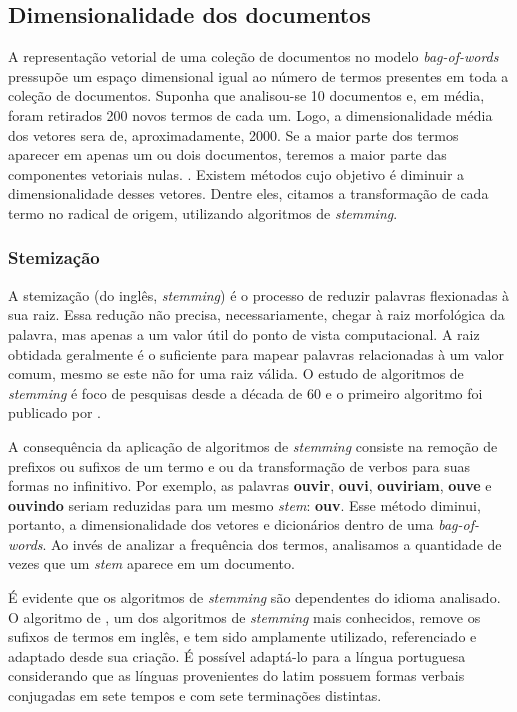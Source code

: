 \subsection{Dimensionalidade dos documentos}
\label{sub:dimensionalidade_dos_documentos}

A representação vetorial de uma coleção de documentos no modelo \textit{bag-of-words} pressupõe um espaço dimensional igual ao número de termos presentes em toda a coleção de documentos. Suponha que analisou-se 10 documentos e, em média, foram retirados 200 novos termos de cada um. Logo, a dimensionalidade média dos vetores sera de, aproximadamente, 2000. Se a maior parte dos termos aparecer em apenas um ou dois documentos, teremos a maior parte das componentes vetoriais nulas. \cite{pretext}. Existem métodos cujo objetivo é diminuir a dimensionalidade desses vetores. Dentre eles, citamos a transformação de cada termo no radical de origem, utilizando algoritmos de \textit{stemming}.

\subsubsection{Stemização}
\label{ssub:stemização}

A stemização (do inglês, \textit{stemming}) é o processo de reduzir palavras flexionadas à sua raiz. Essa redução não precisa, necessariamente, chegar à raiz morfológica da palavra, mas apenas a um valor útil do ponto de vista computacional. A raiz obtidada geralmente é o suficiente para mapear palavras relacionadas à um valor comum, mesmo se este não for uma raiz válida. O estudo de algoritmos de \textit{stemming} é foco de pesquisas desde a década de 60 e o primeiro algoritmo foi publicado por .

A consequência da aplicação de algoritmos de \textit{stemming} consiste na remoção de prefixos ou sufixos de um termo e ou da transformação de verbos para suas formas no infinitivo. Por exemplo, as palavras \textbf{ouvir}, \textbf{ouvi}, \textbf{ouviriam}, \textbf{ouve} e \textbf{ouvindo} seriam reduzidas para um mesmo \textit{stem}: \textbf{ouv}. Esse método diminui, portanto, a dimensionalidade dos vetores e dicionários dentro de uma \textit{bag-of-words}. Ao invés de analizar a frequência dos termos, analisamos a quantidade de vezes que um \textit{stem} aparece em um documento.

É evidente que os algoritmos de \textit{stemming} são dependentes do idioma analisado. O algoritmo de , um dos algoritmos de \textit{stemming} mais conhecidos, remove os sufixos de termos em inglês, e tem sido amplamente utilizado, referenciado e adaptado desde sua criação. É possível adaptá-lo para a língua portuguesa considerando que as línguas provenientes do latim possuem formas verbais conjugadas em sete tempos e com sete terminações distintas.

